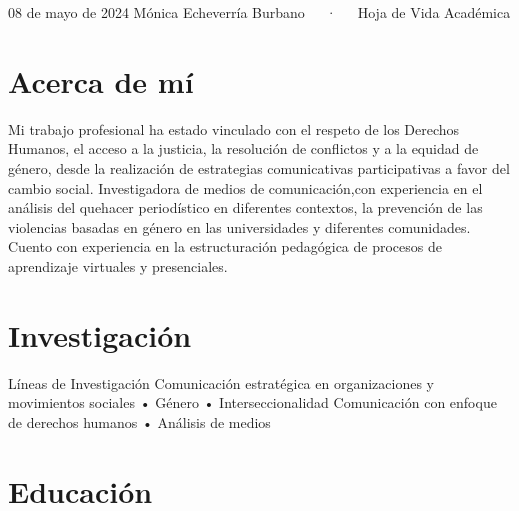 \documentclass[11pt,a4paper,]{awesome-cv}
\begin{document}
\makecvheader

\makecvfooter
  {08 de mayo de 2024}
    {Mónica Echeverría Burbano~~~·~~~Hoja de Vida Académica}
  {\thepage}





\hypertarget{acerca-de-muxed}{%
\section{Acerca de mí}\label{acerca-de-muxed}}

Mi trabajo profesional ha estado vinculado con el respeto de los
Derechos Humanos, el acceso a la justicia, la resolución de conflictos y
a la equidad de género, desde la realización de estrategias
comunicativas participativas a favor del cambio social. Investigadora de
medios de comunicación,con experiencia en el análisis del quehacer
periodístico en diferentes contextos, la prevención de las violencias
basadas en género en las universidades y diferentes comunidades. Cuento
con experiencia en la estructuración pedagógica de procesos de
aprendizaje virtuales y presenciales.

\hypertarget{investigaciuxf3n}{%
\section{Investigación}\label{investigaciuxf3n}}

\begin{cvskills}
  \cvskill
    {Líneas de Investigación}
    {Comunicación estratégica en organizaciones y movimientos sociales • Género • Interseccionalidad \newline
    Comunicación con enfoque de derechos humanos • Análisis de medios}
\end{cvskills}

\hypertarget{educaciuxf3n}{%
\section{Educación}\label{educaciuxf3n}}
\end{document}

